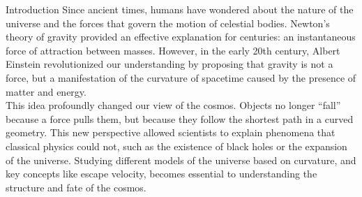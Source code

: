 \documentclass[final]{beamer}
\newlength{\colwidth}
\begin{document}
\begin{frame}[t]
\begin{columns}[t]
\begin{column}{\colwidth}
  \begin{block}{Introduction}
    Since ancient times, humans have wondered about the nature of the universe and the forces that govern the motion of celestial bodies. Newton's theory of gravity provided an effective explanation for centuries: an instantaneous force of attraction between masses. However, in the early 20th century, Albert Einstein revolutionized our understanding by proposing that gravity is not a force, but a manifestation of the curvature of spacetime caused by the presence of matter and energy.\\
    This idea profoundly changed our view of the cosmos. Objects no longer “fall” because a force pulls them, but because they follow the shortest path in a curved geometry. This new perspective allowed scientists to explain phenomena that classical physics could not, such as the existence of black holes or the expansion of the universe. Studying different models of the universe based on curvature, and key concepts like escape velocity, becomes essential to understanding the structure and fate of the cosmos.
  \end{block}


\end{column}
\end{columns}
\end{frame}
\end{document}
